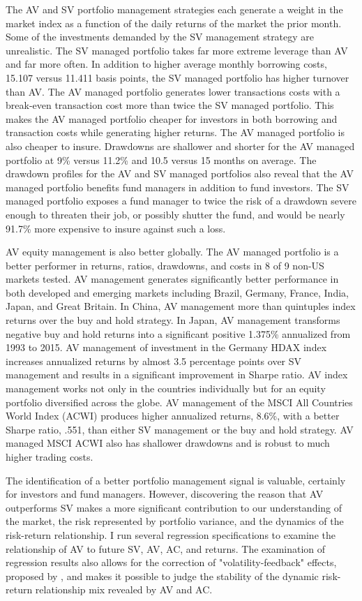 The AV and SV portfolio management strategies each generate a weight in the market index as a function of the daily returns of the market the prior month. Some of the investments demanded by the SV management strategy are unrealistic. The SV managed portfolio takes far more extreme leverage than AV and far more often. In addition to higher average monthly borrowing costs, 15.107 versus 11.411 basis points, the SV managed portfolio has higher turnover than AV. The AV managed portfolio generates lower transactions costs with a break-even transaction cost more than twice the SV managed portfolio. This makes the AV managed portfolio cheaper for investors in both borrowing and transaction costs while generating higher returns. The AV managed portfolio is also cheaper to insure. Drawdowns are shallower and shorter for the AV managed portfolio at 9\% versus 11.2\% and 10.5 versus 15 months on average. The drawdown profiles for the AV and SV managed portfolios also reveal that the AV managed portfolio benefits fund managers in addition to fund investors. The SV managed portfolio exposes a fund manager to twice the risk of a drawdown severe enough to threaten their job, or possibly shutter the fund, and would be nearly 91.7\% more expensive to insure against such a loss.

AV equity management is also better globally. The AV managed portfolio is a better performer in returns, ratios, drawdowns, and costs in 8 of 9 non-US markets tested. AV management generates significantly better performance in both developed and emerging markets including Brazil, Germany, France, India, Japan, and Great Britain. In China, AV management more than quintuples index returns over the buy and hold strategy. In Japan, AV management transforms negative buy and hold returns into a significant positive 1.375\% annualized from 1993 to 2015. AV management of investment in the Germany HDAX index increases annualized returns by almost 3.5 percentage points over SV management and results in a significant improvement in Sharpe ratio. AV index management works not only in the countries individually but for an equity portfolio diversified across the globe. AV management of the MSCI All Countries World Index (ACWI) produces higher annualized returns, 8.6\%, with a better Sharpe ratio, .551, than either SV management or the buy and hold strategy. AV managed MSCI ACWI also has shallower drawdowns and is robust to much higher trading costs. 

The identification of a better portfolio management signal is valuable, certainly for investors and fund managers. However, discovering the reason that AV outperforms SV makes a more significant contribution to our understanding of the market, the risk represented by portfolio variance, and the dynamics of the risk-return relationship. I run several regression specifications to examine the relationship of AV to future SV, AV, AC, and returns. The examination of regression results also allows for the correction of "volatility-feedback" effects, proposed by \citet{campbell_no_1992}, and makes it possible to judge the stability of the dynamic risk-return relationship mix revealed by AV and AC.

